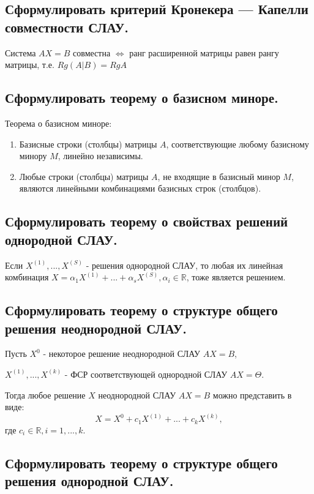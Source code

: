 \subsection{Сформулировать критерий Кронекера — Капелли совместности СЛАУ.}

Система $AX = B$ совместна $\iff$ ранг расширенной матрицы равен рангу матрицы, т.е. $Rg(A|B)=RgA$

\subsection{Сформулировать теорему о базисном миноре.}

Теорема о базисном миноре:
\begin{enumerate}
    \item Базисные строки (столбцы) матрицы $A$, соответствующие любому базисному минору $M$, линейно независимы.
    \item Любые строки (столбцы) матрицы $A$, не входящие в базисный минор $M$, являются линейными комбинациями базисных строк (столбцов).
\end{enumerate}

\subsection{Сформулировать теорему о свойствах решений однородной СЛАУ.}

Если $X^{(1)}, ..., X^{(S)}$ - решения однородной СЛАУ, то любая их линейная комбинация $X = \alpha_1X^{(1)}+ ...+ \alpha_sX^{(S)}, \alpha_i\in\mathbb{R}$, тоже является решением.

\subsection{Сформулировать теорему о структуре общего решения неоднородной СЛАУ.}

Пусть $X^0$ - некоторое решение неоднородной СЛАУ $AX = B$, 

$X^{(1)}, ..., X^{(k)}$ - ФСР соответствующей однородной СЛАУ $AX = \Theta.$

Тогда любое решение $X$ неоднородной СЛАУ $AX = B$ можно представить в виде:
$$X = X^0 + c_1X^{(1)}+ ...+ c_kX^{(k)},$$
где $c_i\in\mathbb{R}, i = 1, ..., k$.

\subsection{Сформулировать теорему о структуре общего решения однородной СЛАУ.}

